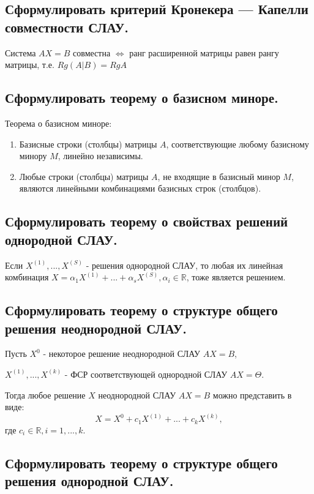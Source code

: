 \subsection{Сформулировать критерий Кронекера — Капелли совместности СЛАУ.}

Система $AX = B$ совместна $\iff$ ранг расширенной матрицы равен рангу матрицы, т.е. $Rg(A|B)=RgA$

\subsection{Сформулировать теорему о базисном миноре.}

Теорема о базисном миноре:
\begin{enumerate}
    \item Базисные строки (столбцы) матрицы $A$, соответствующие любому базисному минору $M$, линейно независимы.
    \item Любые строки (столбцы) матрицы $A$, не входящие в базисный минор $M$, являются линейными комбинациями базисных строк (столбцов).
\end{enumerate}

\subsection{Сформулировать теорему о свойствах решений однородной СЛАУ.}

Если $X^{(1)}, ..., X^{(S)}$ - решения однородной СЛАУ, то любая их линейная комбинация $X = \alpha_1X^{(1)}+ ...+ \alpha_sX^{(S)}, \alpha_i\in\mathbb{R}$, тоже является решением.

\subsection{Сформулировать теорему о структуре общего решения неоднородной СЛАУ.}

Пусть $X^0$ - некоторое решение неоднородной СЛАУ $AX = B$, 

$X^{(1)}, ..., X^{(k)}$ - ФСР соответствующей однородной СЛАУ $AX = \Theta.$

Тогда любое решение $X$ неоднородной СЛАУ $AX = B$ можно представить в виде:
$$X = X^0 + c_1X^{(1)}+ ...+ c_kX^{(k)},$$
где $c_i\in\mathbb{R}, i = 1, ..., k$.

\subsection{Сформулировать теорему о структуре общего решения однородной СЛАУ.}

